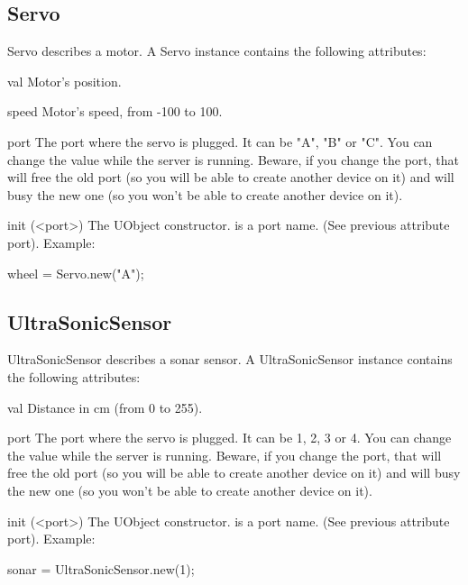 \subsection{Servo}
Servo describes a motor. A Servo instance contains the following attributes:

\begin{urbiscriptapi}
\item[val] Motor's position.

\item[speed] Motor's speed, from -100 to 100.

\item[port] The port where the servo is plugged. It can be "A", "B" or
  "C". You can change the value while the server is running. Beware, if you
  change the port, that will free the old port (so you will be able to
  create another device on it) and will busy the new one (so you won't be
  able to create another device on it).

\item[init](<port>) The UObject constructor.  is a port name. (See
  previous attribute port). Example:
\begin{urbiunchecked}
  wheel = Servo.new("A");
\end{urbiunchecked}
\end{urbiscriptapi}


\subsection{UltraSonicSensor}
UltraSonicSensor describes a sonar sensor. A UltraSonicSensor instance
contains the following attributes:

\begin{urbiscriptapi}
\item[val] Distance in cm (from 0 to 255).

\item[port] The port where the servo is plugged. It can be 1, 2, 3 or 4. You
  can change the value while the server is running. Beware, if you change
  the port, that will free the old port (so you will be able to create
  another device on it) and will busy the new one (so you won't be able to
  create another device on it).

\item[init](<port>) The UObject constructor.  is a port name. (See
  previous attribute port). Example:
\begin{urbiunchecked}
  sonar = UltraSonicSensor.new(1);
\end{urbiunchecked}

\end{urbiscriptapi}

